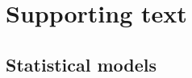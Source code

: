 %		
%



\newpage
\section{Supporting text}
\label{sec:s3_text}

\subsection{Statistical models}
\label{sec:s3_text_stat_models}

